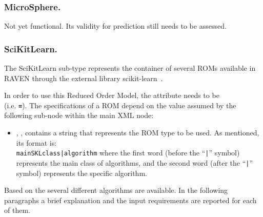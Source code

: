 \subsubsection{MicroSphere.}
\label{subsubsec:microSphere}
Not yet functional.
%
Its validity for prediction still needs to be assessed.
%
\subsubsection{SciKitLearn.}
\label{subsubsec:SciKitLearn}
The SciKitLearn sub-type represents the container of several ROMs available in
RAVEN through the external library scikit-learn~\cite{SciKitLearn}.
%

In order to use this Reduced Order Model, the  attribute
 needs to be \\  (i.e. 
\textbf{\texttt{=}}).
%
The specifications of a  ROM depend on the value assumed
by the following sub-node within the main  XML node:
\begin{itemize}
  \item {}, , contains a string that represents the ROM type to be used.
  As mentioned, its format is:\\
  \texttt{mainSKLclass|algorithm} where the
  first word (before the ``\texttt{|}'' symbol) represents the main class of
  algorithms, and the second word (after the ``\texttt{|}'' symbol) represents
  the specific algorithm.
\end{itemize}
Based on the  several different algorithms are available.
%
In the following paragraphs a brief explanation and the input requirements are
reported for each of them.
%
